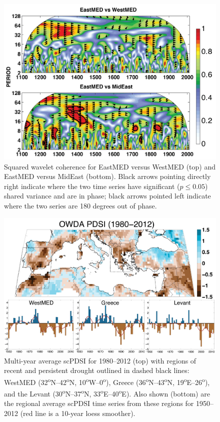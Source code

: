 \documentclass[draft,jgr]{AGUTeX}
\begin{document}
\begin{figure}
\center
\includegraphics[width=1.0\columnwidth]{fig_10_wavelet_coh.png}
\caption{Squared wavelet coherence for EastMED versus WestMED (top) and EastMED versus MidEast (bottom). Black arrows pointing directly right indicate where the two time series have significant ($p\le0.05$) shared variance and are in phase; black arrows pointed left indicate where the two series are 180 degrees out of phase.}\label{placeholder}
\end{figure}

\begin{figure}
\center
\includegraphics[width=1.0\columnwidth]{fig_11_map_bar_pdsi.png}
\caption{Multi-year average scPDSI for 1980--2012 (top) with regions of recent and persistent drought outlined in dashed black lines: WestMED (32\textsuperscript{o}N--42\textsuperscript{o}N, 10\textsuperscript{o}W--0\textsuperscript{o}), Greece (36\textsuperscript{o}N--43\textsuperscript{o}N, 19\textsuperscript{o}E--26\textsuperscript{o}), and the Levant (30\textsuperscript{o}N--37\textsuperscript{o}N, 33\textsuperscript{o}E--40\textsuperscript{o}E). Also shown (bottom) are the regional average scPDSI time series from these regions for 1950--2012 (red line is a 10-year loess smoother).}\label{placeholder}
\end{figure}
\end{document}
